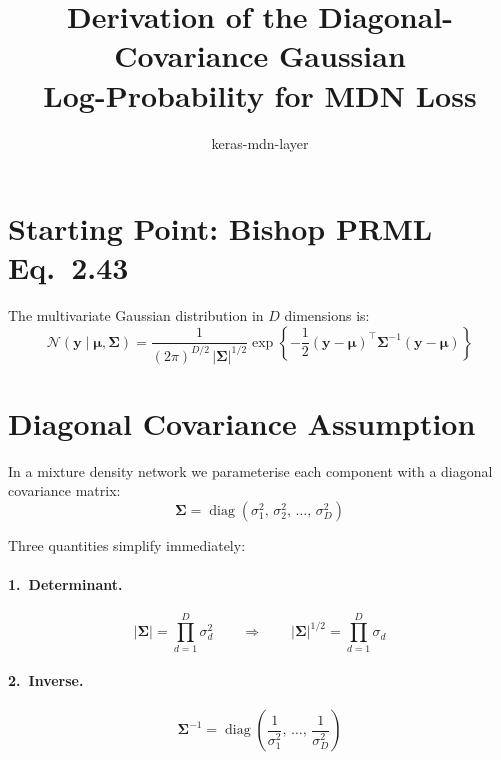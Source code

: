 \documentclass[11pt]{article}
\title{Derivation of the Diagonal-Covariance Gaussian\\Log-Probability for MDN Loss}
\author{keras-mdn-layer}
\date{}
\begin{document}
\maketitle

\section*{Starting Point: Bishop PRML Eq.~2.43}

The multivariate Gaussian distribution in $D$ dimensions is:
\begin{equation}
    \mathcal{N}(\mathbf{y} \mid \boldsymbol{\mu}, \boldsymbol{\Sigma})
    = \frac{1}{(2\pi)^{D/2}\,|\boldsymbol{\Sigma}|^{1/2}}
      \exp\!\left\{
        -\frac{1}{2}(\mathbf{y}-\boldsymbol{\mu})^\top
        \boldsymbol{\Sigma}^{-1}
        (\mathbf{y}-\boldsymbol{\mu})
      \right\}
    \tag{PRML 2.43}
\end{equation}

\section*{Diagonal Covariance Assumption}

In a mixture density network we parameterise each component with a
diagonal covariance matrix:
\begin{equation}
    \boldsymbol{\Sigma}
    = \operatorname{diag}(\sigma_1^2,\, \sigma_2^2,\, \dots,\, \sigma_D^2)
\end{equation}

Three quantities simplify immediately:

\paragraph{1.\ Determinant.}
\begin{equation}
    |\boldsymbol{\Sigma}|
    = \prod_{d=1}^{D} \sigma_d^2
    \qquad\Longrightarrow\qquad
    |\boldsymbol{\Sigma}|^{1/2}
    = \prod_{d=1}^{D} \sigma_d
\end{equation}

\paragraph{2.\ Inverse.}
\begin{equation}
    \boldsymbol{\Sigma}^{-1}
    = \operatorname{diag}\!\left(
        \frac{1}{\sigma_1^2},\, \dots,\, \frac{1}{\sigma_D^2}
      \right)
\end{equation}
\end{document}
